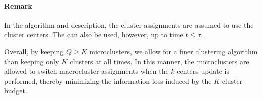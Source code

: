 \paragraph{Remark}
In the algorithm and description, the cluster assignments are assumed to use the cluster centers. The  can also be used, however, up to time $t\leq \tau$.  

Overall, by keeping $Q\geq K$ microclusters, we allow for a finer clustering algorithm than keeping only $K$ clusters at all times. In this manner, the microclusters are allowed to switch macrocluster assignments when the $k$-centers update is performed, thereby minimizing the information loss induced by the $K$-cluster budget.







